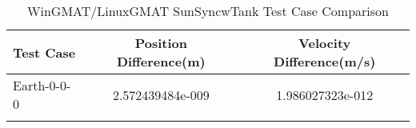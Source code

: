 \begin{table}[htbp!]
\centering
\caption{ WinGMAT/LinuxGMAT SunSyncwTank Test Case Comparison}
      \begin{tabular}{lcc}
      \hline\hline
          Test Case & Position Difference(m) & Velocity Difference(m/s) \\
         \hline
         Earth-0-0-0 & 2.572439484e-009 & 1.986027323e-012 \\
      \hline\hline
      \label{Table: SunSyncwTank WinGMAT-LinuxGMAT Table} 
\end{tabular}
\end{table}
